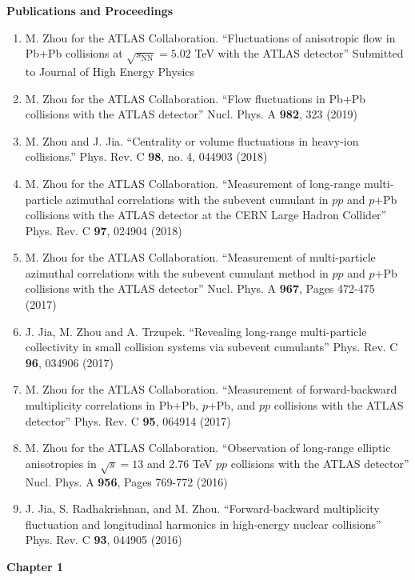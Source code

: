 \documentclass[12pt]{article}
\begin{document}
\newpage
\centerline{\bf{Publications and Proceedings}}
\vspace*{4\baselineskip}
\begin{enumerate}
\item M. Zhou for the ATLAS Collaboration. ``Fluctuations of anisotropic flow in Pb+Pb collisions at $\sqrt{s_\text{NN}}=5.02$ TeV with the ATLAS detector'' Submitted to Journal of High Energy Physics
\item M. Zhou for the ATLAS Collaboration. ``Flow fluctuations in Pb+Pb collisions with the ATLAS detector'' Nucl. Phys. A \textbf{982}, 323 (2019)
\item M. Zhou and J. Jia. ``Centrality or volume fluctuations in heavy-ion collisions.'' Phys. Rev. C \textbf{98}, no. 4, 044903 (2018)
\item M. Zhou for the ATLAS Collaboration. ``Measurement of long-range multi-particle azimuthal correlations with the subevent cumulant in $pp$ and $p$+Pb collisions with the ATLAS detector at the CERN Large Hadron Collider'' Phys. Rev. C \textbf{97}, 024904 (2018)
\item M. Zhou for the ATLAS Collaboration. ``Measurement of multi-particle azimuthal correlations with the subevent cumulant method in $pp$ and $p$+Pb collisions with the ATLAS detector'' Nucl. Phys. A \textbf{967}, Pages 472-475 (2017)
\item J. Jia, M. Zhou and A. Trzupek. ``Revealing long-range multi-particle collectivity in small collision systems via subevent cumulants'' Phys. Rev. C \textbf{96}, 034906 (2017)
\item M. Zhou for the ATLAS Collaboration. ``Measurement of forward-backward multiplicity correlations in Pb+Pb, $p$+Pb, and $pp$ collisions with the ATLAS detector'' Phys. Rev. C \textbf{95}, 064914 (2017)
\item M. Zhou for the ATLAS Collaboration. ``Observation of long-range elliptic anisotropies in $\sqrt{s}=13$ and 2.76 TeV $pp$ collisions with the ATLAS detector'' Nucl. Phys. A \textbf{956}, Pages 769-772 (2016)
\item J. Jia, S. Radhakrishnan, and M. Zhou. ``Forward-backward multiplicity fluctuation and longitudinal harmonics in high-energy nuclear collisions'' Phys. Rev. C \textbf{93}, 044905 (2016)
\end{enumerate}


\newpage
{}
{\bf\huge{Chapter 1}\par}

\end{document}
